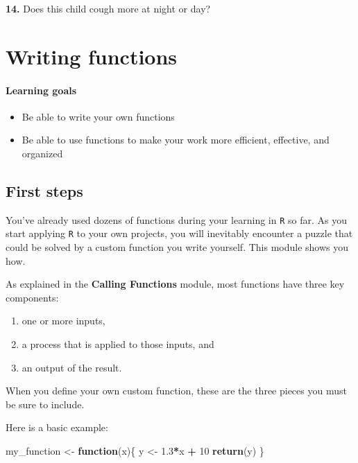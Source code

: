 \documentclass[]{book}
\newenvironment{Shaded}{\begin{snugshade}}{\end{snugshade}}
\newcommand{\ControlFlowTok}[1]{\textcolor[rgb]{0.13,0.29,0.53}{\textbf{#1}}}
\newcommand{\DecValTok}[1]{\textcolor[rgb]{0.00,0.00,0.81}{#1}}
\newcommand{\FloatTok}[1]{\textcolor[rgb]{0.00,0.00,0.81}{#1}}
\newcommand{\KeywordTok}[1]{\textcolor[rgb]{0.13,0.29,0.53}{\textbf{#1}}}
\newcommand{\NormalTok}[1]{#1}
\newcommand{\OperatorTok}[1]{\textcolor[rgb]{0.81,0.36,0.00}{\textbf{#1}}}
\newcommand{\StringTok}[1]{\textcolor[rgb]{0.31,0.60,0.02}{#1}}
\providecommand{\tightlist}{%
  \setlength{\itemsep}{0pt}\setlength{\parskip}{0pt}}
\begin{document}
\textbf{14.} Does this child cough more at night or day?

\hypertarget{writing-functions}{%
\chapter{Writing functions}\label{writing-functions}}

\hypertarget{learning-goals-31}{%
\subsubsection*{Learning goals}\label{learning-goals-31}}

\begin{itemize}
\tightlist
\item
  Be able to write your own functions
\item
  Be able to use functions to make your work more efficient, effective, and organized
\end{itemize}

\hypertarget{first-steps}{%
\section*{First steps}\label{first-steps}}

You've already used dozens of functions during your learning in \texttt{R} so far. As you start applying \texttt{R} to your own projects, you will inevitably encounter a puzzle that could be solved by a custom function you write yourself. This module shows you how.

As explained in the \textbf{Calling Functions} module, most functions have three key components:

\begin{enumerate}
\def\labelenumi{(\arabic{enumi})}
\tightlist
\item
  one or more inputs,\\
\item
  a process that is applied to those inputs, and\\
\item
  an output of the result.
\end{enumerate}

When you define your own custom function, these are the three pieces you must be sure to include.

Here is a basic example:

\begin{Shaded}
\begin{Highlighting}[]
\NormalTok{my_function <-}\StringTok{ }\ControlFlowTok{function}\NormalTok{(x)\{}
\NormalTok{  y <-}\StringTok{ }\FloatTok{1.3}\OperatorTok{*}\NormalTok{x }\OperatorTok{+}\StringTok{ }\DecValTok{10}
  \KeywordTok{return}\NormalTok{(y)}
\NormalTok{\}}
\end{Highlighting}
\end{Shaded}
\end{document}
